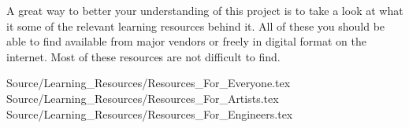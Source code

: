

A great way to better your understanding of this project is to take a look at what it some of the relevant learning resources behind it. All of these you should be able to find available from major vendors or freely in digital format on the internet. Most of these resources are not difficult to find.

\component Source/Learning_Resources/Resources_For_Everyone.tex
\component Source/Learning_Resources/Resources_For_Artists.tex
\component Source/Learning_Resources/Resources_For_Engineers.tex


